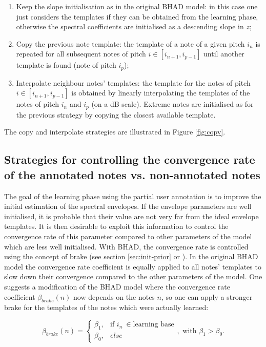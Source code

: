 \documentclass{article}
\begin{document}
\begin{enumerate}
\item Keep the slope initialisation as in the original BHAD model: in this case one just considers the templates if they can be obtained from the learning phase, otherwise the spectral coefficients are initialised as a descending slope in $z$;
\item Copy the previous note template: the template of a note of a given pitch $i_n$ is repeated for all subsequent notes of pitch $i \in [i_{n+1}, i_{p-1}]$ until another template is found (note of pitch $i_p$);
\item Interpolate neighbour notes' templates: the template for the notes of pitch $i \in [i_{n+1}, i_{p-1}]$ is obtained by linearly interpolating the templates of the notes of pitch $i_n$ and $i_p$ (on a dB scale). Extreme notes are initialised as for the previous strategy by copying the closest available template.
\end{enumerate}

The copy and interpolate strategies are illustrated in Figure \ref{fig:copy}.



\subsection{Strategies for controlling the convergence rate of the annotated notes vs. non-annotated notes}

The goal of the learning phase using the partial user annotation is to improve the initial estimation of the spectral envelopes. If the envelope parameters are well initialised, it is probable that their value are not very far from the ideal envelope templates.  It is then desirable to exploit this information to control the convergence rate of this parameter compared to other parameters of the model which are less well initialised. With BHAD, the convergence rate is controlled using the concept of brake (see section \ref{sec:init-prior} or \cite{Fuentes2012_EUSIPCO}). In the original BHAD model the convergence rate coefficient is equally applied to all notes' templates to slow down their convergence compared to the other parameters of the model.
One suggests a modification of the BHAD model where the convergence rate coefficient $\beta_{brake}(n)$ now depends on the notes $n$, so one can apply a stronger brake for the templates of the notes which were actually learned:

\begin{equation}
\beta_{brake}(n) = \left\{
\begin{array}{ll}
\beta_1, & \textrm{if }i_n\ \in \textrm{learning base} \\
\beta_0, & else
\end{array}
\right. , \textrm{ with } \beta_1 > \beta_0.
\end{equation}
\end{document}
